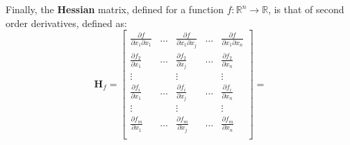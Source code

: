 Finally, the \textbf{Hessian} matrix, defined for a function $f:\mathbb{R}^n \rightarrow \mathbb{R}$, is that of second order derivatives, defined as: 
\begin{equation}
 \mathbf{H}_f = 
 \left[
\begin{array}{ccccc}
  \frac{\partial f }{\partial x_1 \partial x_1} & \dots & \frac{\partial f}{\partial x_1 \partial x_j} & \dots & \frac{\partial f }{\partial x_1 \partial x_n} \\
  \frac{\partial f_2 }{\partial x_1} & \dots & \frac{\partial f_2 }{\partial x_j} & \dots & \frac{\partial f_2 }{\partial x_n} \\
  \vdots & & \vdots & & \vdots \\
  \frac{\partial f_i }{\partial x_1} & \dots & \frac{\partial f_i }{\partial x_j} & \dots & \frac{\partial f_i }{\partial x_n} \\
  \vdots & & \vdots & & \vdots \\
  \frac{\partial f_m }{\partial x_1} & \dots & \frac{\partial f_m }{\partial x_j} & \dots & \frac{\partial f_m }{\partial x_n} \\
\end{array}
\right] = 
\end{equation}
